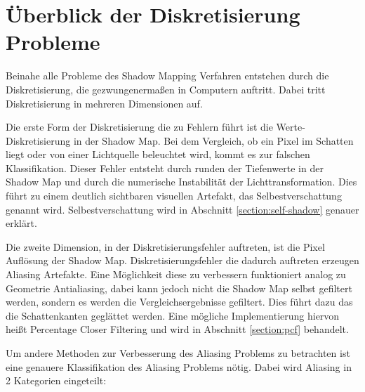 \section{Überblick der Diskretisierung Probleme}
\label{section:problem-overview}
Beinahe alle Probleme des Shadow Mapping Verfahren entstehen durch die Diskretisierung,
die gezwungenermaßen in Computern auftritt. 
Dabei tritt Diskretisierung in mehreren Dimensionen auf.
\par
Die erste Form der Diskretisierung die zu Fehlern führt ist die Werte-Diskretisierung 
in der Shadow Map. 
Bei dem Vergleich, ob ein Pixel im Schatten liegt oder von einer Lichtquelle beleuchtet wird,
kommt es zur falschen Klassifikation. Dieser Fehler entsteht durch runden der Tiefenwerte in der Shadow Map und
durch die numerische Instabilität der Lichttransformation.
Dies führt zu einem deutlich sichtbaren visuellen Artefakt, das Selbestverschattung genannt wird.
Selbestverschattung wird in Abschnitt \ref{section:self-shadow} genauer erklärt.
\par
Die zweite Dimension, in der Diskretisierungsfehler auftreten, ist die Pixel Auflösung der Shadow Map.
Diskretisierungsfehler die dadurch auftreten erzeugen Aliasing Artefakte.
Eine Möglichkeit diese zu verbessern funktioniert analog zu Geometrie Antialiasing, dabei kann jedoch
nicht die Shadow Map selbst gefiltert werden, sondern es werden die Vergleichsergebnisse gefiltert.
Dies führt dazu das die Schattenkanten geglättet werden. 
Eine mögliche Implementierung hiervon heißt Percentage Closer Filtering
und wird in Abschnitt \ref{section:pcf} behandelt.
\par
Um andere Methoden zur Verbesserung des Aliasing Problems zu betrachten ist eine genauere Klassifikation des Aliasing Problems 
nötig. 
Dabei wird Aliasing in 2 Kategorien eingeteilt:
